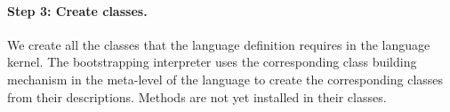 \paragraph{\textbf{Step 3: Create classes.}}
We create all the classes that the language definition requires in the language kernel. The bootstrapping interpreter uses the corresponding class building mechanism in the meta-level of the language to create the corresponding classes from their descriptions. Methods are not yet installed in their classes.


